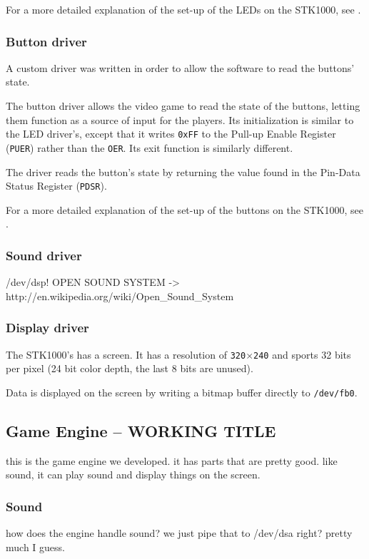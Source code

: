 		For a more detailed explanation of the set-up of the LEDs on the STK1000, see \cite{tdt4258-1}.
	\subsubsection{Button driver}
		A custom driver was written in order to allow the software to read the buttons' state.

		The button driver allows the video game to read the state of the buttons, letting them function as a source of input for the players.
		Its initialization is similar to the LED driver's, except that it writes \texttt{0xFF} to the Pull-up Enable Register (\texttt{PUER}) rather than the \texttt{OER}.
		Its exit function is similarly different.

		The driver reads the button's state by returning the value found in the Pin-Data Status Register (\texttt{PDSR}).


		For a more detailed explanation of the set-up of the buttons on the STK1000, see \cite{tdt4258-1}.	
	\subsubsection{Sound driver}
		/dev/dsp!
		OPEN SOUND SYSTEM -> http://en.wikipedia.org/wiki/Open_Sound_System
	\subsubsection{Display driver}
		The STK1000's has a screen.
		It has a resolution of \texttt{320}$\times$\texttt{240} and sports 32 bits per pixel (24 bit color depth, the last 8 bits are unused)\cite{lab-compendium}.

		Data is displayed on the screen by writing a bitmap buffer directly to \texttt{/dev/fb0}.


\subsection{Game Engine -- WORKING TITLE}
	this is the game engine we developed. it has parts that are pretty good. like sound, it can play sound and display things on the screen.
	\subsubsection{Sound}
		how does the engine handle sound?
		we just pipe that to /dev/dsa right?
		pretty much I guess.
